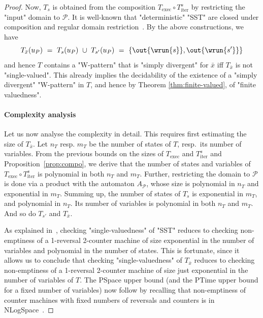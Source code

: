 \documentclass{theoretics}
\begin{document}
\begin{proof}
    Now, $T_s$ is obtained from the  composition
    $T_{\mathrm{exec}} \circ T_{\mathrm{iter}}^s$ by 
    restricting the "input" domain to $\mathcal{P}$.
    It is well-known that
    "deterministic" "SST" are closed under  composition 
    and regular domain restriction~\cite{DBLP:conf/fsttcs/AlurC10}. 
    By the above constructions, we have
    \[
      T_{\bar x}(u_P) 
      ~=~ T_s(u_P) ~\cup~ T_{s'}(u_P)
      ~=~ \{\out{\wrun{s}},\out{\wrun{s'}}\}
    \]
    and hence $T$ contains a "W-pattern" that is 
    "simply divergent" for $\bar x$ iff 
    $T_{\bar x}$ is not "single-valued".
    This already implies the decidability of the
    existence of a "simply divergent" "W-pattern" in $T$,
    and hence by Theorem \ref{thm:finite-valued},
    of "finite valuedness".

    \paragraph{Complexity analysis} 
    Let us now analyse the complexity  in detail.    
    This requires first estimating the size of $T_{\bar x}$. Let $n_T$ resp. $m_T$ be the number of states of $T$,
    resp.~its number of variables. 
   From the previous bounds on the sizes of
    $T_{\mathrm{exec}}$ and $T^s_{\mathrm{iter}}$ and Proposition~\ref{prop:compo}, 
    we derive that the number of states and variables of 
    $T_{\mathrm{exec}}\circ T^s_{\mathrm{iter}}$ is polynomial 
    in both $n_T$ and $m_T$.
    Further, restricting the domain to $\mathcal{P}$ is done 
    via a product with the automaton $A_\mathcal{P}$,
    whose size is polynomial in $n_T$ 
    and exponential in $m_T$.
    Summing up, the number of states of $T_s$ is exponential 
    in $m_T$, and polynomial in $n_T$.
    Its number of variables is polynomial in both $n_T$ and $m_T$.
    And so do $T_{s'}$ and $T_{\bar x}$. 
    
    As explained in~\cite{DBLP:conf/icalp/AlurD11}, 
    checking "single-valuedness" of "SST" reduces to 
    checking non-emptiness of a 1-reversal 2-counter 
    machine of size exponential in the number of variables 
    and polynomial in the number of states. 
    This is  fortunate, since it allows us
    to conclude that checking "single-valuedness" of 
    $T_{\bar x}$ reduces to checking non-emptiness of 
    a 1-reversal 2-counter machine of size just exponential 
    in the number of variables of $T$. 
    The {\upshape\sc PSpace} upper bound (and the {\upshape\sc PTime} upper
    bound for a fixed number of variables) now follow by recalling
    that non-emptiness of counter machines with fixed numbers of reversals and counters is
    in {\upshape\sc NLogSpace}~\cite{DBLP:journals/jcss/GurariI81}. 



\end{proof}
\end{document}
